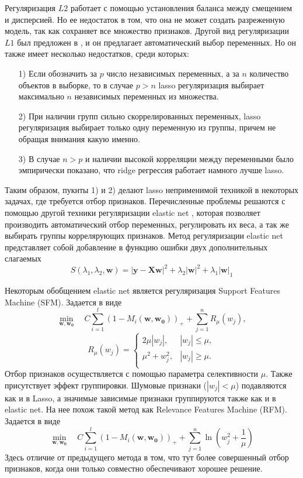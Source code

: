 \documentclass[12pt, twoside]{article}
\newcommand{\xmatr}{{\mathbf{X}}}
\newcommand{\yb}{{\mathbf{y}}}
\newcommand{\wm}{{\mathbf{w}}}
\begin{document}
Регуляризация $L2$ работает с помощью установления баланса между смещением и дисперсией. Но ее недостаток в том, что она не может создать разреженную модель, так как сохраняет все множество признаков. Другой вид регуляризации $L1$ был предложен в \cite{bib_2}, и он предлагает автоматический выбор переменных. Но он также имеет несколько недостатков, среди которых:
\begin{enumerate}
\item[1)]
Если обозначить за $p$ число независимых переменных, а за $n$ количество объектов в выборке, то в случае $p>n$ lasso регуляризация выбирает максимально $n$ независимых переменных из множества.
\item[2)]
При наличии групп сильно скоррелированных переменных, lasso регуляризация выбирает только одну переменную из группы, причем не обращая внимания какую именно.
\item[3)]
В случае $n>p$ и наличии высокой корреляции между переменными было эмпирически показано, что ridge регрессия работает намного лучше lasso.
\end{enumerate}
Таким образом, пукнты 1) и 2) делают lasso неприменимой техникой в некоторых задачах, где требуется отбор признаков. Перечисленные проблемы решаются с помощью другой техники регуляризации elastic net \cite{bib_3}, которая позволяет производить автоматический отбор переменных, регулировать их веса, а так же выбирать группы коррелярующих признаков. Метод регуляризации elastic net представляет собой добавление в функцию ошибки двух дополнительных слагаемых
\begin{equation}
S(\lambda_1,\lambda_2,\wm) = |\yb-\xmatr\wm|^2+\lambda_2|\wm|^2+\lambda_1|\wm|_1
\end{equation}

Некоторым обобщением elastic net является регуляризация Support Features Machine (SFM). Задается в виде
\begin{equation}
\underset{\mathbf{w},\mathbf{w_0}}\min\quad C\sum_{i=1}^l(1 - M_i(\mathbf{w},\mathbf{w_0}))_+ + \sum_{j=1}^nR_{\mu}(w_j),
\end{equation}
\begin{equation}
R_{\mu}(w_j) = \begin{cases}
2\mu|w_j|,& |w_j| \leq \mu, \\
\mu^2 + w_j^2,& |w_j| \geq \mu. \\
\end{cases}
\end{equation}
Отбор признаков осуществляется с помощью параметра селективности $\mu$. Также присутствует эффект группировки. Шумовые признаки ($|w_j| < \mu$) подавляются как и в Lasso, а значимые зависимые признаки группируются также как и в elastic net.
На нее похож такой метод как Relevance Features Machine (RFM). Задается в виде
\begin{equation}
\underset{\mathbf{w},\mathbf{w_0}}\min\quad C\sum_{i=1}^l(1 - M_i(\mathbf{w},\mathbf{w_0}))_+ + \sum_{j=1}^n\ln(w_j^2 + \frac{1}{\mu})
\end{equation}
Здесь отличие от предыдущего метода в том, что тут более совершенный отбор признаков, когда они только совместно обеспечивают хорошее решение.
\end{document}
